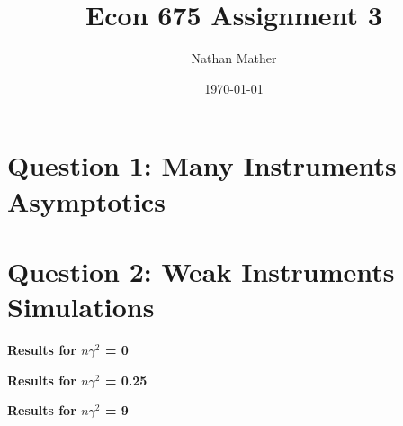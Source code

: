 \documentclass[11pt]{article}
\title{Econ 675 Assignment 3} %
\author{Nathan Mather}  %
\date{\today} %
\begin{document}
	
\maketitle %

\setcounter{tocdepth}{2} %

\tableofcontents %



\section{Question 1: Many Instruments Asymptotics}





\section{Question 2: Weak Instruments Simulations}

\begin{center}
	
	\centering
	
	\textbf{Results for $n \gamma^2$ = 0}\par\medskip
	\scalebox{1}{
		
	}
\end{center}

\begin{center}
	
	\centering
	
	\textbf{Results for $n \gamma^2$ = 0.25}\par\medskip
	\scalebox{1}{
		
	}
\end{center}

\begin{center}
	
	\centering
	
	\textbf{Results for $n \gamma^2$ = 9}\par\medskip
	\scalebox{1}{
		
	}
\end{center}
\end{document}
